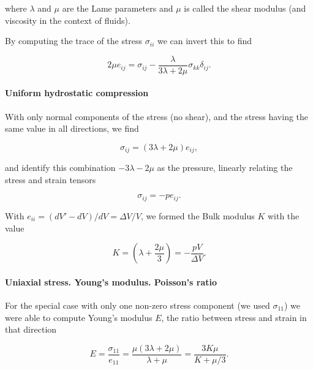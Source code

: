 where $\lambda$ and $\mu$ are the Lame parameters and $\mu$ is called the shear modulus (and viscosity in the context of fluids).

By computing the trace of the stress $\sigma_{ii}$ we can invert this to find

\begin{equation}\label{eqn:continuumElasticityReview:330}
2 \mu e_{ij} = \sigma_{ij} - \frac{\lambda}{3 \lambda + 2 \mu} \sigma_{kk} \delta_{ij}.
\end{equation}

\paragraph{Uniform hydrostatic compression}

With only normal components of the stress (no shear), and the stress having the same value in all directions, we find

\begin{equation}\label{eqn:continuumElasticityReview:350}
\sigma_{ij} = ( 3 \lambda + 2 \mu ) e_{ij},
\end{equation}

and identify this combination $-3 \lambda - 2 \mu$ as the pressure, linearly relating the stress and strain tensors

\begin{equation}\label{eqn:continuumElasticityReview:370}
\sigma_{ij} = -p e_{ij}.
\end{equation}

With $e_{ii} = (dV' - dV)/dV = \Delta V/V$, we formed the Bulk modulus $K$ with the value

\begin{equation}\label{eqn:continuumElasticityReview:390}
K = \left( \lambda + \frac{2 \mu}{3} \right) = -\frac{p V}{\Delta V}.
\end{equation}

\paragraph{Uniaxial stress.  Young's modulus.  Poisson's ratio}

For the special case with only one non-zero stress component (we used $\sigma_{11}$) we were able to compute Young's modulus $E$, the ratio between stress and strain in that direction

\begin{equation}\label{eqn:continuumElasticityReview:410}
E = \frac{\sigma_{11}}{e_{11}} = \frac{\mu(3 \lambda + 2 \mu)}{\lambda + \mu }  = \frac{3 K \mu}{K + \mu/3}.
\end{equation}

